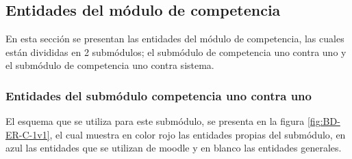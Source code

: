 \clearpage
\subsection{Entidades del módulo de competencia}

 En esta sección se presentan las entidades del módulo de competencia,
 las cuales están divididas en 2 submódulos;
 el submódulo de competencia uno contra uno y el submódulo de competencia uno contra sistema.\\

    \subsubsection{Entidades del submódulo competencia uno contra uno}

        El esquema que se utiliza para este submódulo, se presenta en la figura
        \ref{fig:BD-ER-C-1v1}, el cual muestra en color rojo las entidades propias del submódulo,
        en azul las entidades que se utilizan de moodle  y en blanco las entidades generales.



